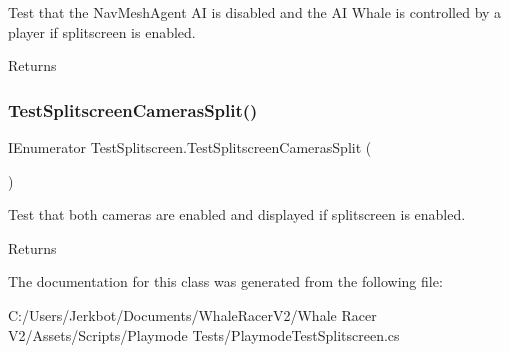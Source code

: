 Test that the Nav\+Mesh\+Agent AI is disabled and the \textquotesingle{}AI Whale\textquotesingle{} is controlled by a player if splitscreen is enabled. 

\begin{DoxyReturn}{Returns}

\end{DoxyReturn}
\mbox{\label{class_test_splitscreen_ada07c146c9a8cc889e096f7de9e783c8}} 
\subsubsection{\texorpdfstring{Test\+Splitscreen\+Cameras\+Split()}{TestSplitscreenCamerasSplit()}}
{\footnotesize\ttfamily I\+Enumerator Test\+Splitscreen.\+Test\+Splitscreen\+Cameras\+Split (\begin{DoxyParamCaption}{ }\end{DoxyParamCaption})}



Test that both cameras are enabled and displayed if splitscreen is enabled. 

\begin{DoxyReturn}{Returns}

\end{DoxyReturn}


The documentation for this class was generated from the following file\+:\begin{DoxyCompactItemize}
\item 
C\+:/\+Users/\+Jerkbot/\+Documents/\+Whale\+Racer\+V2/\+Whale Racer V2/\+Assets/\+Scripts/\+Playmode Tests/Playmode\+Test\+Splitscreen.\+cs\end{DoxyCompactItemize}
